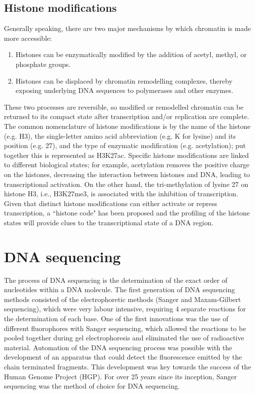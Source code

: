 \subsection{Histone modifications}

Generally speaking, there are two major mechanisms by which chromatin is made more accessible:

\begin{enumerate}
   \item Histones can be enzymatically modified by the addition of acetyl, methyl, or phosphate groups.
   \item Histones can be displaced by chromatin remodelling complexes, thereby exposing underlying DNA sequences to polymerases and other enzymes.
\end{enumerate}

These two processes are reversible, so modified or remodelled chromatin can be returned to its compact state after transcription and/or replication are complete. The common nomenclature of histone modifications is by the name of the histone (e.g. H3), the single-letter amino acid abbreviation (e.g. K for lysine) and its position (e.g. 27), and the type of enzymatic modification (e.g. acetylation); put together this is represented as H3K27ac. Specific histone modifications are linked to different biological states; for example, acetylation removes the positive charge on the histones, decreasing the interaction between histones and DNA, leading to transcriptional activation. On the other hand, the tri-methylation of lysine 27 on histone H3, i.e., H3K27me3, is associated with the inhibition of transcription\cite{pmid21652639}. Given that distinct histone modifications can either activate or repress transcription, a ``histone code" has been proposed\cite{pmid11498575} and the profiling of the histone states will provide clues to the transcriptional state of a DNA region.

\section{DNA sequencing}

The process of DNA sequencing is the determination of the exact order of nucleotides within a DNA molecule. The first generation of DNA sequencing methods consisted of the electrophoretic methods (Sanger and Maxam-Gilbert sequencing), which were very labour intensive, requiring 4 separate reactions for the determination of each base. One of the first innovations was the use of different fluorophores with Sanger sequencing, which allowed the reactions to be pooled together during gel electrophoresis and eliminated the use of radioactive material. Automation of the DNA sequencing process was possible with the development of an apparatus that could detect the fluorescence emitted by the chain terminated fragments. This development was key towards the success of the Human Genome Project (HGP). For over 25 years since its inception, Sanger sequencing was the method of choice for DNA sequencing.

